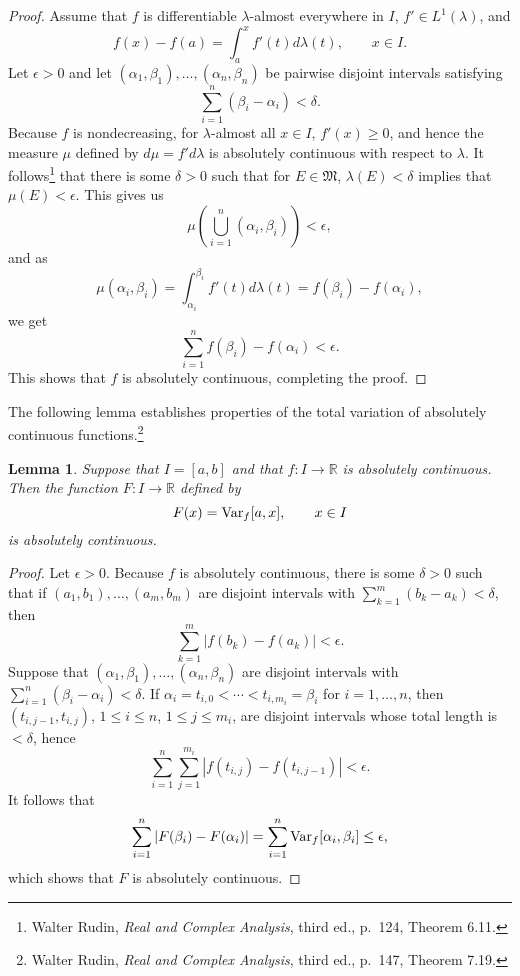 \documentclass{article}
\newcommand{\Var}{\ensuremath\mathrm{Var}}
\newtheorem{lemma}[theorem]{Lemma}
\theoremstyle{definition}
\begin{document}
\begin{proof}
Assume that $f$ is differentiable $\lambda$-almost everywhere in $I$, $f' \in L^1(\lambda)$, and
\[
f(x)-f(a) = \int_a^x f'(t) d\lambda(t), \qquad x \in I.
\]
Let $\epsilon>0$ and let $(\alpha_1,\beta_1),\ldots,(\alpha_n,\beta_n)$ be pairwise disjoint intervals satisfying
\[
\sum_{i=1}^n (\beta_i-\alpha_i)<\delta.
\]
Because $f$ is nondecreasing, for $\lambda$-almost all $x \in I$, $f'(x) \geq 0$, and hence
the measure $\mu$ defined by $d\mu = f' d\lambda$ is absolutely continuous with respect to $\lambda$.
It follows\footnote{Walter Rudin, {\em Real and Complex Analysis}, third ed., p.~124, Theorem 6.11.}
that there is some $\delta>0$ such that for $E \in \mathfrak{M}$,
$\lambda(E)<\delta$ implies that $\mu(E)<\epsilon$. This gives us
\[
\mu\left(\bigcup_{i=1}^n (\alpha_i,\beta_i) \right)
<\epsilon,
\]
and as
\[
\mu(\alpha_i,\beta_i)=\int_{\alpha_i}^{\beta_i} f'(t) d\lambda(t)
=f(\beta_i)-f(\alpha_i),
\]
we get
\[
\sum_{i=1}^n f(\beta_i)-f(\alpha_i)<\epsilon.
\]
This shows that $f$ is absolutely continuous, completing the proof.
\end{proof}


The following lemma establishes properties of the total variation of absolutely continuous functions.\footnote{Walter Rudin,
{\em Real and Complex Analysis}, third ed., p.~147, Theorem 7.19.}

\begin{lemma}
Suppose that $I=[a,b]$ and that $f:I \to \mathbb{R}$ is absolutely continuous. Then the function $F:I \to \mathbb{R}$ defined
by
\[
F(x)=\Var_f[a,x], \qquad x \in I
\]
is absolutely continuous.
\label{Fvariation}
\end{lemma}
\begin{proof}
Let $\epsilon>0$. Because $f$ is absolutely continuous,
there is some $\delta>0$ such that if
 $(a_1,b_1),\ldots,(a_m,b_m)$ are disjoint intervals
with $\sum_{k=1}^m (b_k-a_k)<\delta$, then
\[
\sum_{k=1}^m |f(b_k)-f(a_k)|<\epsilon.
\]
Suppose that $(\alpha_1,\beta_1),\ldots,(\alpha_n,\beta_n)$ are disjoint intervals with
$\sum_{i=1}^n (\beta_i-\alpha_i)<\delta$. If
 $\alpha_i=t_{i,0}<\cdots<t_{i,m_i}=\beta_i$ for $i=1,\ldots,n$, then
 $(t_{i,j-1},t_{i,j})$, $1 \leq i \leq n$, $1 \leq j \leq m_i$, are disjoint intervals
whose total length is $<\delta$, hence 
\[
\sum_{i=1}^n \sum_{j=1}^{m_i} |f(t_{i,j})-f(t_{i,j-1})|<\epsilon.
\]
It follows that
\[
\sum_{i=1}^n |F(\beta_i)-F(\alpha_i)|
=\sum_{i=1}^n \Var_f[\alpha_i,\beta_i]
\leq \epsilon,
\]
which shows that $F$ is absolutely continuous.
\end{proof}
\end{document}
